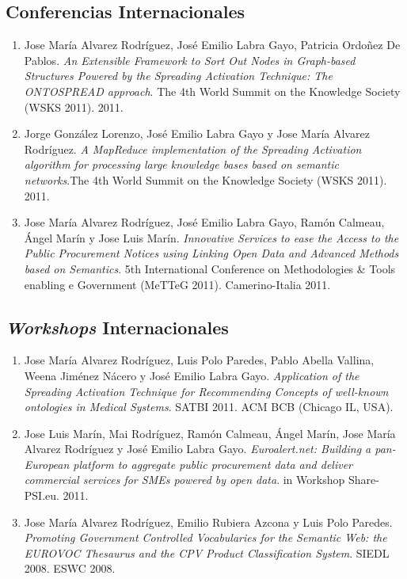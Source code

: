 \subsection{Conferencias Internacionales}

\begin{enumerate}
\item Jose María Alvarez Rodríguez, José Emilio Labra Gayo, Patricia Ordoñez De Pablos.\textit{ An Extensible Framework to Sort Out 
Nodes in Graph-based Structures Powered by the Spreading Activation Technique: The ONTOSPREAD approach}. The 4th World Summit on the 
Knowledge Society (WSKS 2011). 2011.
\item Jorge González Lorenzo, José Emilio Labra Gayo y Jose María Alvarez Rodríguez. \textit{A MapReduce implementation of the Spreading Activation 
algorithm for processing large knowledge bases based on semantic networks}.The 4th World Summit on the 
Knowledge Society (WSKS 2011). 2011.
\item Jose María Alvarez Rodríguez, José Emilio Labra Gayo, Ramón Calmeau, Ángel Marín y Jose Luis Marín.\textit{ Innovative Services to ease the Access to the Public Procurement Notices 
using Linking Open Data and Advanced Methods based on Semantics}. 5th International Conference on Methodologies \& Tools enabling e Government (MeTTeG 2011). Camerino-Italia 2011.
\end{enumerate}

\subsection{\textit{Workshops} Internacionales}

\begin{enumerate}
\item Jose María Alvarez Rodríguez, Luis Polo Paredes, Pablo Abella Vallina, Weena Jiménez Nácero y José Emilio Labra Gayo. 
\textit{Application of the Spreading Activation Technique for Recommending Concepts of well-known ontologies in Medical Systems}. 
SATBI 2011. ACM BCB (Chicago IL, USA).
\item Jose Luis Marín, Mai Rodríguez, Ramón Calmeau, Ángel Marín, Jose María Alvarez Rodríguez y José Emilio Labra Gayo.
\textit{Euroalert.net: Building a pan-European platform to aggregate public procurement data and deliver commercial services for SMEs powered by open data}.
in Workshop Share-PSI.eu. 2011.
\item Jose María Alvarez Rodríguez, Emilio Rubiera Azcona y Luis Polo Paredes. \textit{Promoting Government Controlled Vocabularies 
for the Semantic Web: the EUROVOC Thesaurus and the CPV Product Classification System}. SIEDL 2008. ESWC 2008. 
\end{enumerate}

